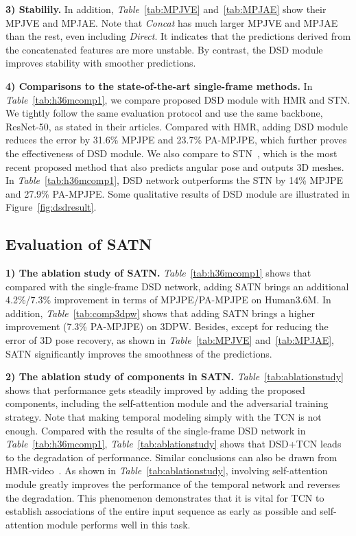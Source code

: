 \documentclass[10pt,twocolumn,letterpaper]{article}
\begin{document}
\textbf{3) Stabilily.} In addition, \textit{Table}~\ref{tab:MPJVE} and~\ref{tab:MPJAE} show their MPJVE and MPJAE. Note that \textit{Concat} has much larger MPJVE and MPJAE than the rest, even including \textit{Direct}. It indicates that the predictions derived from the concatenated features are more unstable. By contrast, the DSD module improves stability with smoother predictions.

\textbf{4) Comparisons to the state-of-the-art single-frame methods.} In \textit{Table}~\ref{tab:h36mcomp1}, we compare proposed DSD module with HMR and STN. We tightly follow the same evaluation protocol and use the same backbone, ResNet-50, as stated in their articles. Compared with HMR, adding DSD module reduces the error by 31.6\% MPJPE and 23.7\% PA-MPJPE, which further proves the effectiveness of DSD module. We also compare to STN~\cite{yoshiyasu2018skeleton}, which is the most recent proposed method that also predicts angular pose and outputs 3D meshes. In \textit{Table}~\ref{tab:h36mcomp1}, DSD network outperforms the STN by 14\% MPJPE and 27.9\% PA-MPJPE. Some qualitative results of DSD module are illustrated in Figure~\ref{fig:dsdresult}.

\subsection{Evaluation of SATN}


\textbf{1) The ablation study of SATN.} \textit{Table}~\ref{tab:h36mcomp1} shows that compared with the single-frame DSD network, adding SATN brings an additional 4.2\%/7.3\% improvement in terms of MPJPE/PA-MPJPE on Human3.6M. In addition, \textit{Table}~\ref{tab:comp3dpw} shows that adding SATN brings a higher improvement (7.3\% PA-MPJPE) on 3DPW. Besides, except for reducing the error of 3D pose recovery, as shown in \textit{Table}~\ref{tab:MPJVE} and~\ref{tab:MPJAE}, SATN significantly improves the smoothness of the predictions. 

\textbf{2) The ablation study of components in SATN.} \textit{Table}~\ref{tab:ablationstudy} shows that performance gets steadily improved by adding the proposed components, including the self-attention module and the adversarial training strategy. Note that making temporal modeling simply with the TCN is not enough. Compared with the results of the single-frame DSD network in \textit{Table}~\ref{tab:h36mcomp1}, \textit{Table}~\ref{tab:ablationstudy} shows that DSD+TCN leads to the degradation of performance. Similar conclusions can also be drawn from HMR-video~\cite{kanazawa2018learning}. As shown in \textit{Table}~\ref{tab:ablationstudy}, involving self-attention module greatly improves the performance of the temporal network and reverses the degradation. This phenomenon demonstrates that it is vital for TCN to establish associations of the entire input sequence as early as possible and self-attention module performs well in this task. 
\end{document}
